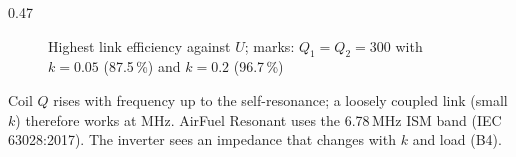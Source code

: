 \begin{frame}
\begin{columns}[T]
\begin{column}{0.47\textwidth}
\begin{figure}
\begin{tikzpicture}
				\end{tikzpicture}
				\caption{Highest link efficiency against $U$; marks: $Q_1=Q_2=300$ with $k=0.05$ (87.5\,\%) and $k=0.2$ (96.7\,\%)}
			\end{figure}
			\vspace{-0.4cm}
			\footnotesize
			Coil $Q$ rises with frequency up to the self-resonance; a loosely coupled link (small $k$) therefore works at MHz. AirFuel Resonant uses the 6.78\,MHz ISM band (IEC 63028:2017). The inverter sees an impedance that changes with $k$ and load (B4).
		\end{column}
	\end{columns}
\end{frame}


